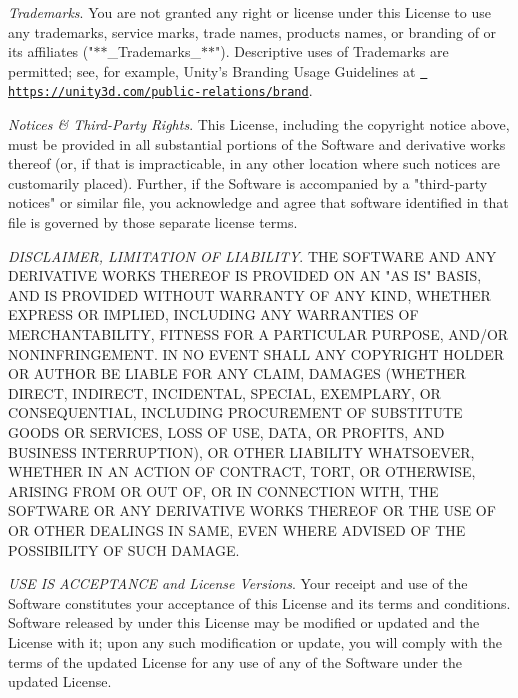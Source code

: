 \begin{DoxyEnumerate}
\item {\itshape Trademarks}. You are not granted any right or license under this License to use any trademarks, service marks, trade names, products names, or branding of  or its affiliates ("{}\texorpdfstring{$\ast$}{*}\texorpdfstring{$\ast$}{*}\+\_\+\+Trademarks\+\_\+\texorpdfstring{$\ast$}{*}\texorpdfstring{$\ast$}{*}"{}). Descriptive uses of Trademarks are permitted; see, for example, Unity’s Branding Usage Guidelines at \href{https://unity3d.com/public-relations/brand}{\texttt{ https\+://unity3d.\+com/public-\/relations/brand}}.
\end{DoxyEnumerate}
\begin{DoxyEnumerate}
\item {\itshape Notices \& Third-\/\+Party Rights}. This License, including the copyright notice above, must be provided in all substantial portions of the Software and derivative works thereof (or, if that is impracticable, in any other location where such notices are customarily placed). Further, if the Software is accompanied by a  "{}third-\/party notices"{} or similar file, you acknowledge and agree that software identified in that file is governed by those separate license terms.
\end{DoxyEnumerate}
\begin{DoxyEnumerate}
\item {\itshape DISCLAIMER, LIMITATION OF LIABILITY}. THE SOFTWARE AND ANY DERIVATIVE WORKS THEREOF IS PROVIDED ON AN "{}\+AS IS"{} BASIS, AND IS PROVIDED WITHOUT WARRANTY OF ANY KIND, WHETHER EXPRESS OR IMPLIED, INCLUDING ANY WARRANTIES OF MERCHANTABILITY, FITNESS FOR A PARTICULAR PURPOSE, AND/\+OR NONINFRINGEMENT. IN NO EVENT SHALL ANY COPYRIGHT HOLDER OR AUTHOR BE LIABLE FOR ANY CLAIM, DAMAGES (WHETHER DIRECT, INDIRECT, INCIDENTAL, SPECIAL, EXEMPLARY, OR CONSEQUENTIAL, INCLUDING PROCUREMENT OF SUBSTITUTE GOODS OR SERVICES, LOSS OF USE, DATA, OR PROFITS, AND BUSINESS INTERRUPTION), OR OTHER LIABILITY WHATSOEVER, WHETHER IN AN ACTION OF CONTRACT, TORT, OR OTHERWISE, ARISING FROM OR OUT OF, OR IN CONNECTION WITH, THE SOFTWARE OR ANY DERIVATIVE WORKS THEREOF OR THE USE OF OR OTHER DEALINGS IN SAME, EVEN WHERE ADVISED OF THE POSSIBILITY OF SUCH DAMAGE.
\end{DoxyEnumerate}
\begin{DoxyEnumerate}
\item {\itshape USE IS ACCEPTANCE and License Versions}. Your receipt and use of the Software constitutes your acceptance of this License and its terms and conditions. Software released by  under this License may be modified or updated and the License with it; upon any such modification or update, you will comply with the terms of the updated License for any use of any of the Software under the updated License.
\end{DoxyEnumerate}
